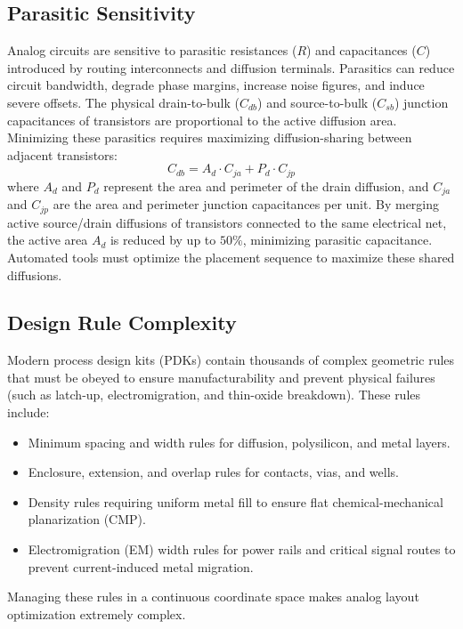 \subsection{Parasitic Sensitivity}
Analog circuits are sensitive to parasitic resistances ($R$) and capacitances ($C$) introduced by routing interconnects and diffusion terminals. Parasitics can reduce circuit bandwidth, degrade phase margins, increase noise figures, and induce severe offsets. The physical drain-to-bulk ($C_{db}$) and source-to-bulk ($C_{sb}$) junction capacitances of transistors are proportional to the active diffusion area. Minimizing these parasitics requires maximizing diffusion-sharing between adjacent transistors:
\begin{equation}
    C_{db} = A_d \cdot C_{ja} + P_d \cdot C_{jp}
\end{equation}
where $A_d$ and $P_d$ represent the area and perimeter of the drain diffusion, and $C_{ja}$ and $C_{jp}$ are the area and perimeter junction capacitances per unit. By merging active source/drain diffusions of transistors connected to the same electrical net, the active area $A_d$ is reduced by up to $50\%$, minimizing parasitic capacitance. Automated tools must optimize the placement sequence to maximize these shared diffusions.

\subsection{Design Rule Complexity}
Modern process design kits (PDKs) contain thousands of complex geometric rules that must be obeyed to ensure manufacturability and prevent physical failures (such as latch-up, electromigration, and thin-oxide breakdown). These rules include:
\begin{itemize}
    \item Minimum spacing and width rules for diffusion, polysilicon, and metal layers.
    \item Enclosure, extension, and overlap rules for contacts, vias, and wells.
    \item Density rules requiring uniform metal fill to ensure flat chemical-mechanical planarization (CMP).
    \item Electromigration (EM) width rules for power rails and critical signal routes to prevent current-induced metal migration.
\end{itemize}
Managing these rules in a continuous coordinate space makes analog layout optimization extremely complex.

